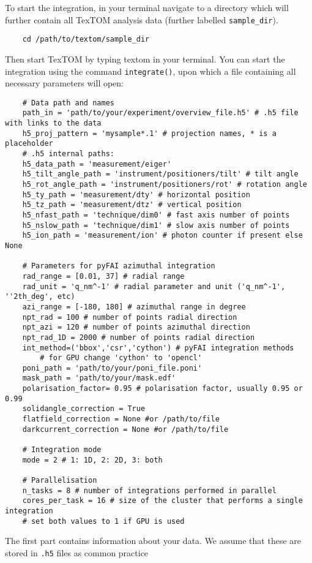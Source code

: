 To start the integration, in your terminal navigate to a directory which will further contain all 
TexTOM analysis data (further labelled \texttt{sample\_dir}).
\begin{verbatim}
    cd /path/to/textom/sample_dir
\end{verbatim}
Then start TexTOM by typing textom in your terminal.
You can start the integration using the command \texttt{integrate()}, upon which a file containing all necessary
parameters will open:
\begin{verbatim}
    # Data path and names
    path_in = 'path/to/your/experiment/overview_file.h5' # .h5 file with links to the data
    h5_proj_pattern = 'mysample*.1' # projection names, * is a placeholder
    # .h5 internal paths:
    h5_data_path = 'measurement/eiger'
    h5_tilt_angle_path = 'instrument/positioners/tilt' # tilt angle
    h5_rot_angle_path = 'instrument/positioners/rot' # rotation angle
    h5_ty_path = 'measurement/dty' # horizontal position
    h5_tz_path = 'measurement/dtz' # vertical position
    h5_nfast_path = 'technique/dim0' # fast axis number of points
    h5_nslow_path = 'technique/dim1' # slow axis number of points
    h5_ion_path = 'measurement/ion' # photon counter if present else None
    
    # Parameters for pyFAI azimuthal integration
    rad_range = [0.01, 37] # radial range
    rad_unit = 'q_nm^-1' # radial parameter and unit ('q_nm^-1', ''2th_deg', etc)
    azi_range = [-180, 180] # azimuthal range in degree
    npt_rad = 100 # number of points radial direction
    npt_azi = 120 # number of points azimuthal direction
    npt_rad_1D = 2000 # number of points radial direction
    int_method=('bbox','csr','cython') # pyFAI integration methods
        # for GPU change 'cython' to 'opencl'
    poni_path = 'path/to/your/poni_file.poni'
    mask_path = 'path/to/your/mask.edf'
    polarisation_factor= 0.95 # polarisation factor, usually 0.95 or 0.99
    solidangle_correction = True
    flatfield_correction = None #or /path/to/file
    darkcurrent_correction = None #or /path/to/file
    
    # Integration mode
    mode = 2 # 1: 1D, 2: 2D, 3: both
    
    # Parallelisation
    n_tasks = 8 # number of integrations performed in parallel
    cores_per_task = 16 # size of the cluster that performs a single integration
    # set both values to 1 if GPU is used
\end{verbatim}
The first part contains information about your data. We assume that these are stored in \texttt{.h5} files as common practice
